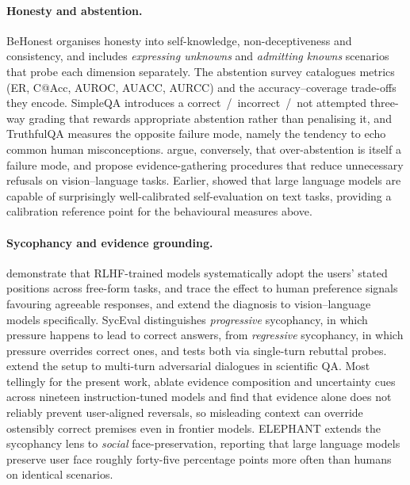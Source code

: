 \paragraph{Honesty and abstention.} BeHonest
\citep{chern2024behonest} organises honesty into self-knowledge,
non-deceptiveness and consistency, and includes \emph{expressing
unknowns} and \emph{admitting knowns} scenarios that probe each
dimension separately. The abstention survey \citep{wen2024knowlimits}
catalogues metrics (ER, C@Acc, AUROC, AUACC, AURCC) and the
accuracy--coverage trade-offs they encode. SimpleQA
\citep{wei2024simpleqa} introduces a correct~/~incorrect~/~not
attempted three-way grading that rewards appropriate abstention
rather than penalising it, and TruthfulQA \citep{lin2022truthfulqa}
measures the opposite failure mode, namely the tendency to echo
common human misconceptions. \citet{ren2024selective} argue,
conversely, that over-abstention is itself a failure mode, and
propose evidence-gathering procedures that reduce unnecessary
refusals on vision--language tasks. Earlier, \citet{kadavath2022know}
showed that large language models are capable of surprisingly
well-calibrated self-evaluation on text tasks, providing a
calibration reference point for the behavioural measures above.

\paragraph{Sycophancy and evidence grounding.}
\citet{sharma2023sycophancy} demonstrate that RLHF-trained models
systematically adopt the users' stated positions across free-form
tasks, and trace the effect to human preference signals favouring
agreeable responses, and \citet{zhao2024vlsycophancy} extend the
diagnosis to vision--language models specifically. SycEval
\citep{fanous2025syceval} distinguishes \emph{progressive}
sycophancy, in which pressure happens to lead to correct answers,
from \emph{regressive} sycophancy, in which pressure overrides
correct ones, and tests both via single-turn rebuttal probes.
\citet{pressure2025sycophancy} extend the setup to multi-turn
adversarial dialogues in scientific QA. Most tellingly for the
present work, \citet{evidencegrounding2026} ablate evidence
composition and uncertainty cues across nineteen instruction-tuned
models and find that evidence alone does not reliably prevent
user-aligned reversals, so misleading context can override
ostensibly correct premises even in frontier models. ELEPHANT
\citep{elephant2025} extends the sycophancy lens to \emph{social}
face-preservation, reporting that large language models preserve
user face roughly forty-five percentage points more often than
humans on identical scenarios.

